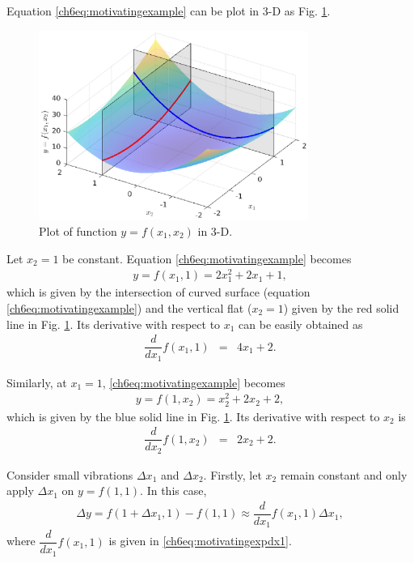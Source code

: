 Equation \eqref{ch6eq:motivatingexample} can be plot in 3-D as Fig. \ref{ch6fig_motivatingexp}.
\begin{figure}
	\centering
	\includegraphics[width=250pt]{chapters/chapter6/figures/fig_motivatingexp.eps}
	\caption{Plot of function $y=f(x_1, x_2)$ in 3-D.} \label{ch6fig_motivatingexp}
\end{figure}

Let $x_2=1$ be constant. Equation \eqref{ch6eq:motivatingexample} becomes
\begin{eqnarray}
	y = f(x_1, 1) = 2x_1^2 + 2x_1 + 1, \nonumber
\end{eqnarray}
which is given by the intersection of  curved surface (equation \eqref{ch6eq:motivatingexample}) and the vertical flat ($x_2=1$) given by the red solid line in Fig. \ref{ch6fig_motivatingexp}. Its derivative with respect to $x_1$ can be easily obtained as
\begin{eqnarray}
	\dfrac{d}{dx_1}f(x_1,1) &=& 4x_1 + 2. \label{ch6eq:motivatingexpdx1}
\end{eqnarray}

Similarly, at $x_1 = 1$, \eqref{ch6eq:motivatingexample} becomes
\begin{eqnarray}
	y = f(1, x_2) = x_2^2 + 2x_2 + 2, \nonumber
\end{eqnarray}
which is given by the blue solid line in Fig. \ref{ch6fig_motivatingexp}. Its derivative with respect to $x_2$ is
\begin{eqnarray}
	\dfrac{d}{dx_2}f(1,x_2) &=& 2x_2 + 2. \label{ch6eq:motivatingexpdx2}
\end{eqnarray}

Consider small vibrations $\Delta x_1$ and $\Delta x_2$. Firstly, let $x_2$ remain constant and only apply $\Delta x_1$ on $y = f(1,1)$. In this case,
\begin{eqnarray}
	\Delta y = f(1+\Delta x_1, 1) - f(1, 1) \approx \dfrac{d}{dx_1}f(x_1,1) \Delta x_1, \label{ch6eq:partialdifx1}
\end{eqnarray}
where $\dfrac{d}{dx_1}f(x_1,1)$ is given in \eqref{ch6eq:motivatingexpdx1}.

